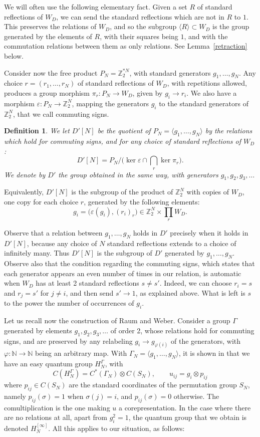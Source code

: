 \documentclass[11pt,a4paper]{article}
\newtheorem{defn}[thm]{Definition}
\begin{document}
We will often use the following elementary fact. Given a set $R$ of standard reflections of $W_D$, we can send the standard reflections which are not in $R$ to $1$. This preserves the relations of $W_D$, and so the subgroup $\langle R\rangle\subset W_D$ is the group generated by the elements of $R$, with their squares being $1$, and with the commutation relations between them as only relations. See Lemma~\ref{retraction} below.

Consider now the free product $P_N=\mathbb Z_2^{*N}$, with standard generators $g_1,\ldots,g_N$. Any choice $r=(r_1,\ldots,r_N)$ of standard reflections of $W_D$, with repetitions allowed, produces a group morphism $\pi_r:P_N\to W_D$, given by $g_i\to r_i$. We also have a morphism $\varepsilon:P_N\to\mathbb Z_2^N$, mapping the generators $g_i$ to the standard generators of $\mathbb Z_2^N$, that we call commuting signs.

\begin{defn}\label{dprime}
We let $D'[N]$ be the quotient of $P_N=\langle g_1,\ldots,g_N\rangle$ by the relations which hold for commuting signs, and for any choice of standard reflections of $W_D$:
\[
 D'[N]=P_N\Big/\Big(\ker\varepsilon\cap\bigcap_r\ker\pi_r\Big).
\]
We denote by $D'$ the group obtained in the same way, with generators $g_1,g_2,g_3,\ldots$
\end{defn}

Equivalently, $D'[N]$ is the subgroup of the product of $\mathbb Z_2^N$ with copies of $W_D$, one copy for each choice $r$, generated by the following elements:
\[
 g_i=\big(\varepsilon(g_i),(r_i)_r\big)\in\mathbb Z_2^N\times\prod_rW_D.
\]

Observe that a relation between $g_1,\ldots,g_N$ holds in $D'$ precisely when it holds in $D'[N]$, because any choice of $N$ standard reflections extends to a choice of infinitely many. Thus $D'[N]$ is the subgroup of $D'$ generated by $g_1,\ldots,g_N$. Observe also that the condition regarding the commuting signs, which states that each generator appears an even number of times in our relation, is automatic when $W_D$ has at least 2 standard reflections $s\neq s'$. Indeed, we can choose $r_i=s$ and $r_j=s'$ for $j\neq i$, and then send $s'\to1$, as explained above. What is left is $s$ to the power the number of occurrences of $g_i$.

Let us recall now the construction of Raum and Weber. Consider a group $\Gamma$ generated by elements $g_1,g_2,g_3,\ldots$ of order 2, whose relations hold for commuting signs, and are preserved by any relabeling $g_i\to g_{\varphi(i)}$ of the generators, with $\varphi:\mathbb N\to\mathbb N$ being an arbitrary map. With $\Gamma_N=\langle g_1,\ldots,g_N\rangle$, it is shown in \cite{rw} that we have an easy quantum group $H_N^\Gamma$, with
\[
 C(H_N^\Gamma)=C^*(\Gamma_N)\otimes C(S_N),\qquad u_{ij}=g_i\otimes p_{ij}
\]
where $p_{ij}\in C(S_N)$ are the standard coordinates of the permutation group $S_N$, namely $p_{ij}(\sigma)=1$ when $\sigma(j)=i$, and $p_{ij}(\sigma)=0$ otherwise. The comultiplication is the one making $u$ a corepresentation. In the case where there are no relations at all, apart from $g_i^2=1$, the quantum group that we obtain is denoted $H_N^{[\infty]}$. All this applies to our situation, as follows:
\end{document}
